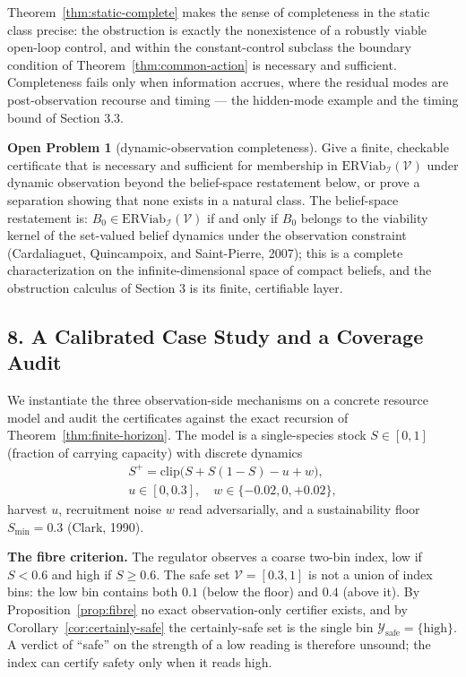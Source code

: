 \documentclass[10pt,twocolumn]{article}
\theoremstyle{definition}
\newtheorem{openproblem}{Open Problem}
\begin{document}
Theorem~\ref{thm:static-complete} makes the sense of completeness in the static class precise: the obstruction is exactly the nonexistence of a robustly viable open-loop control, and within the constant-control subclass the boundary condition of Theorem~\ref{thm:common-action} is necessary and sufficient. Completeness fails only when information accrues, where the residual modes are post-observation recourse and timing --- the hidden-mode example and the timing bound of Section 3.3.

\begin{openproblem}[dynamic-observation completeness]\label{op:dynamic}
Give a finite, checkable certificate that is necessary and sufficient for membership in \(\mathrm{ERViab}_{\mathcal{I}}(\mathcal{V})\) under dynamic observation beyond the belief-space restatement below, or prove a separation showing that none exists in a natural class. The belief-space restatement is: \(B_{0} \in \mathrm{ERViab}_{\mathcal{I}}(\mathcal{V})\) if and only if \(B_{0}\) belongs to the viability kernel of the set-valued belief dynamics under the observation constraint (Cardaliaguet, Quincampoix, and Saint-Pierre, 2007); this is a complete characterization on the infinite-dimensional space of compact beliefs, and the obstruction calculus of Section 3 is its finite, certifiable layer.
\end{openproblem}

\subsection{8. A Calibrated Case Study and a Coverage Audit}\label{case-study}

We instantiate the three observation-side mechanisms on a concrete resource model and audit the certificates against the exact recursion of Theorem~\ref{thm:finite-horizon}. The model is a single-species stock \(S \in [0,1]\) (fraction of carrying capacity) with discrete dynamics
\[
\begin{gathered}
S^{+} = \mathrm{clip}\bigl(S + S(1-S) - u + w\bigr),\\
u \in [0, 0.3],\quad w \in \{-0.02, 0, +0.02\},
\end{gathered}
\]
harvest \(u\), recruitment noise \(w\) read adversarially, and a sustainability floor \(S_{\min} = 0.3\) (Clark, 1990).

\textbf{The fibre criterion.} The regulator observes a coarse two-bin index, low if \(S < 0.6\) and high if \(S \ge 0.6\). The safe set \(\mathcal{V} = [0.3, 1]\) is not a union of index bins: the low bin contains both \(0.1\) (below the floor) and \(0.4\) (above it). By Proposition~\ref{prop:fibre} no exact observation-only certifier exists, and by Corollary~\ref{cor:certainly-safe} the certainly-safe set is the single bin \(\mathcal{Y}_{\mathrm{safe}} = \{\text{high}\}\). A verdict of ``safe'' on the strength of a low reading is therefore unsound; the index can certify safety only when it reads high.
\end{document}
